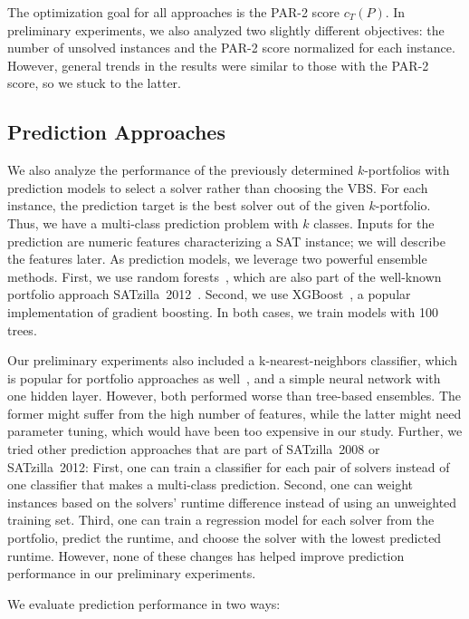 \documentclass[a4paper,USenglish,pdfa]{lipics-v2021} %
\begin{document}
The optimization goal for all approaches is the PAR-2 score $c_T(P)$.
In preliminary experiments, we also analyzed two slightly different objectives:
the number of unsolved instances and the PAR-2 score normalized for each instance.
However, general trends in the results were similar to those with the PAR-2 score, so we stuck to the latter.

\subsection{Prediction Approaches}

We also analyze the performance of the previously determined $k$-portfolios with prediction models to select a solver rather than choosing the VBS. 
For each instance, the prediction target is the best solver out of the given $k$-portfolio.
Thus, we have a multi-class prediction problem with $k$ classes.
Inputs for the prediction are numeric features characterizing a SAT instance; we will describe the features later. 
As prediction models, we leverage two powerful ensemble methods.
First, we use random forests~\cite{breiman2001random}, which are also part of the well-known portfolio approach SATzilla~2012~\cite{xu2012satzilla2012}.
Second, we use XGBoost~\cite{xgboost}, a popular implementation of gradient boosting.
In both cases, we train models with 100 trees.

Our preliminary experiments also included a k-nearest-neighbors classifier, which is popular for portfolio approaches as well~\cite{Collautti:2013:SNNAP,malitsky2011non,nikolic2013simple,samulowitz2013snappy}, and a simple neural network with one hidden layer.
However, both performed worse than tree-based ensembles.
The former might suffer from the high number of features, while the latter might need parameter tuning, which would have been too expensive in our study.
Further, we tried other prediction approaches that are part of SATzilla~2008 or SATzilla~2012:
First, one can train a classifier for each pair of solvers instead of one classifier that makes a multi-class prediction.
Second, one can weight instances based on the solvers' runtime difference instead of using an unweighted training set.
Third, one can train a regression model for each solver from the portfolio, predict the runtime, and choose the solver with the lowest predicted runtime.
However, none of these changes has helped improve prediction performance in our preliminary experiments.

We evaluate prediction performance in two ways:
\end{document}
